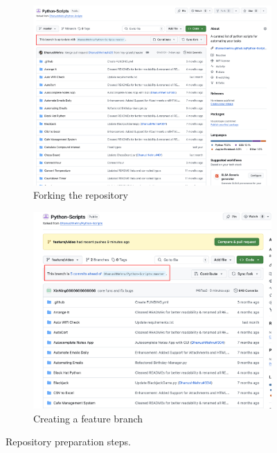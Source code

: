 \documentclass[12pt]{article}
\begin{document}
\begin{figure}[htbp]
  \centering
  \begin{subfigure}{0.48\textwidth}
    \includegraphics[width=\linewidth]{pic/fork.png}
    \caption{Forking the repository}
    \label{fig:fork}
  \end{subfigure}\hfill
  \begin{subfigure}{0.48\textwidth}
    \includegraphics[width=\linewidth]{pic/branch.png}
    \caption{Creating a feature branch}
    \label{fig:branch}
  \end{subfigure}
  \caption{Repository preparation steps.}
\end{figure}
\end{document}
